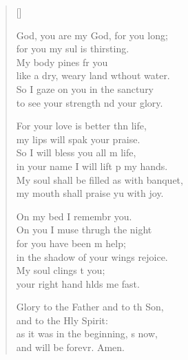 \settowidth{\versewidth}{My soul shall be filled as with a banquet, *}
\begin{verse}[\versewidth]
  \begin{patverse}
     God, you are my God, for you  long;\Med\\
for you my sul is thirsting.\\
My body pines fr you\Med\\
like a dry, weary land wthout water.\\
So I gaze on you in the sanctury\Med\\
to see your strength nd your glory.

For your love is better thn life,\Med\\
my lips will spak your praise.\\
So I will bless you all m life,\Med\\
in your name I will lift p my hands.\\
My soul shall be filled as with  banquet,\Med\\
my mouth shall praise yu with joy.

On my bed I remembr you.\Med\\
On you I muse thrugh the night\\
for you have been m help;\Med\\
in the shadow of your wings  rejoice.\\
My soul clings t you;\Med\\
your right hand hlds me fast.

Glory to the Father and to th Son,\Med\\
and to the Hly Spirit:\\
as it was in the beginning, \pointup{\i}s now,\Med\\
and will be forevr. Amen.
  \end{patverse}
\end{verse}
